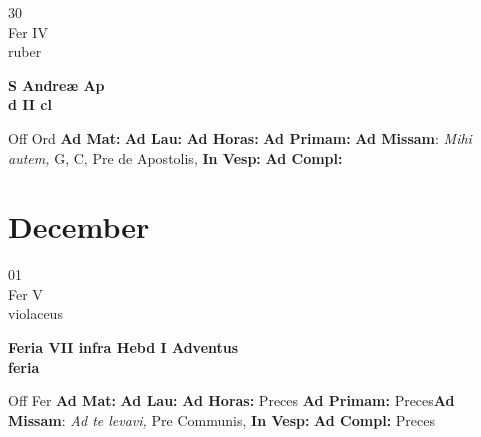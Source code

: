 \documentclass[10pt, openany]{book}
\begin{document}
    \begin{center}
        \begin{minipage}{3.5in}
            \vspace{2em}
            \begin{minipage}{0.5in}
                {\Huge 30} \\
                {\normalsize Fer IV} \\
                {\normalsize ruber}
            \end{minipage}
            \begin{minipage}{3.0in}
                \textbf{ \large S Andreæ Ap \\
                \textnormal{\normalsize d II cl}} \\ 
            \end{minipage}
            \begin{justify}Off Ord
                \textbf{Ad Mat: }
                \textbf{Ad Lau: }
                \textbf{Ad Horas: }
                \textbf{Ad Primam: }\textbf{Ad Missam}: \textit{Mihi autem,} G, C, Pre de Apostolis,  
                \textbf{In Vesp: }
                \textbf{Ad Compl: }
            \end{justify}
        \end{minipage}
    \end{center}

    \chapter{December}
                    
    \begin{center}
        \begin{minipage}{3.5in}
            \vspace{2em}
            \begin{minipage}{0.5in}
                {\Huge 01} \\
                {\normalsize Fer V} \\
                {\normalsize violaceus}
            \end{minipage}
            \begin{minipage}{3.0in}
                \textbf{ \large Feria VII infra Hebd I Adventus \\
                \textnormal{\normalsize feria}} \\ 
            \end{minipage}
            \begin{justify}Off Fer
                \textbf{Ad Mat: }
                \textbf{Ad Lau: }
                \textbf{Ad Horas: }Preces
                \textbf{Ad Primam: }Preces\textbf{Ad Missam}: \textit{Ad te levavi,} Pre Communis,  
                \textbf{In Vesp: }
                \textbf{Ad Compl: }Preces
            \end{justify}
        \end{minipage}
    \end{center}
\end{document}
